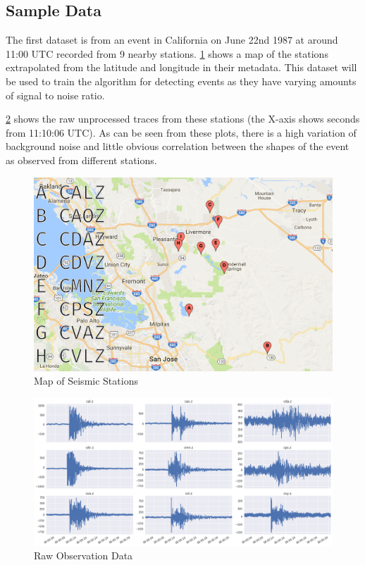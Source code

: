 \documentclass[../report.tex]{subfiles}
\begin{document}
\subsection{Sample Data} \label{sec:sampledata}
	The first dataset is from an event in California on June 22nd 1987 at around 11:00 UTC recorded from 9 nearby stations. \cref{fig:calmap} shows a map of the stations extrapolated from the latitude and longitude in their metadata.  This dataset will be used to train the algorithm for detecting events as they have varying amounts of signal to noise ratio.
	
	\cref{fig:calraw} shows the raw unprocessed traces from these stations (the X-axis shows seconds from 11:10:06 UTC).  As can be seen from these plots, there is a high variation of background noise and little obvious correlation between the shapes of the event as observed from different stations.
	
\begin{figure}[H]
	\centering
	\includegraphics[width=0.7\linewidth]{img/cal-map-key}
	\caption{Map of Seismic Stations}
	\label{fig:calmap}
\end{figure}

\begin{figure}[H]
	\centering
	\includegraphics[width=1\linewidth]{img/cal_raw}
	\caption{Raw Observation Data}
	\label{fig:calraw}
\end{figure}
\end{document}
